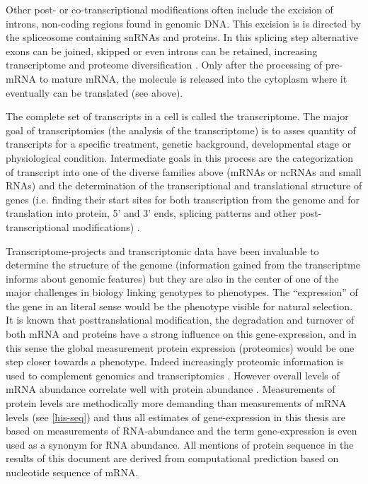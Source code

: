 Other post- or co-transcriptional modifications often include the
excision of introns, non-coding regions found in genomic DNA. This
excision is is directed by the spliceosome containing snRNAs and
proteins. In this splicing step alternative exons can be joined,
skipped or even introns can be retained, increasing transcriptome and
proteome diversification \cite{pmid17158149}. Only after the
processing of pre-mRNA to mature mRNA, the molecule is released into
the cytoplasm where it eventually can be translated (see above).

The complete set of transcripts in a cell is called the
transcriptome. The major goal of transcriptomics (the analysis of the
transcriptome) is to asses quantity of transcripts for a specific
treatment, genetic background, developmental stage or physiological
condition. Intermediate goals in this process are the categorization
of transcript into one of the diverse families above (mRNAs or ncRNAs
and small RNAs) and the determination of the transcriptional and
translational structure of genes (i.e. finding their start sites for
both transcription from the genome and for translation into protein,
5' and 3' ends, splicing patterns and other post-transcriptional
modifications) \cite{pmid19015660}.

Transcriptome-projects and transcriptomic data have been invaluable to
determine the structure of the genome (information gained from the
transcriptme informs about genomic features) but they are also in the
center of one of the major challenges in biology linking genotypes to
phenotypes. The ``expression'' of the gene in an literal sense would
be the phenotype visible for natural selection. It is known that
posttranslational modification, the degradation and turnover of both
mRNA and proteins have a strong influence on this gene-expression, and
in this sense the global measurement protein expression (proteomics)
would be one step closer towards a phenotype. Indeed increasingly
proteomic information is used to complement genomics and
transcriptomics \cite{pmid20121477}. However overall levels of mRNA
abundance correlate well with protein abundance
\cite{pmid21593866}. Measurements of protein levels are methodically
more demanding than measurements of mRNA levels (see \ref{his-seq})
and thus all estimates of gene-expression in this thesis are based on
measurements of RNA-abundance and the term gene-expression is even
used as a synonym for RNA abundance. All mentions of protein sequence
in the results of this document are derived from computational
prediction based on nucleotide sequence of mRNA.

